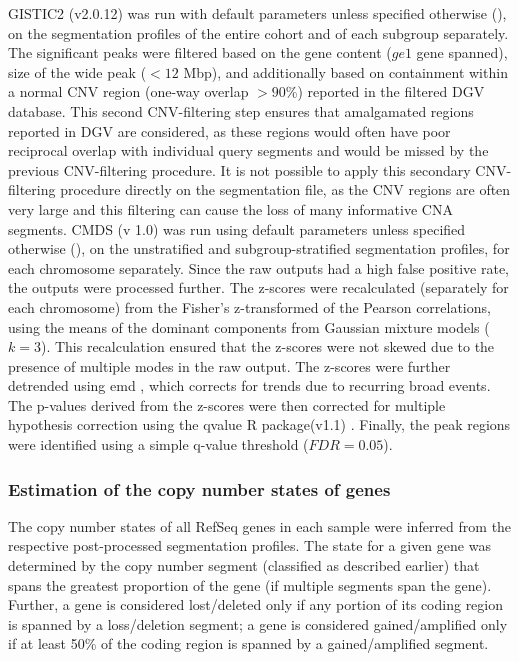 GISTIC2 (v2.0.12)  was run with default parameters unless specified otherwise (), on the segmentation profiles of the entire cohort and of each subgroup separately. The significant peaks were filtered based on the gene content ($ge 1$ gene spanned), size of the wide peak ($< 12$ Mbp), and additionally based on containment within a normal CNV region (one-way overlap $> 90$\%) reported in the filtered DGV database. This second CNV-filtering step ensures that amalgamated regions reported in DGV are considered, as these regions would often have poor reciprocal overlap with individual query segments and would be missed by the previous CNV-filtering procedure. It is not possible to apply this secondary CNV-filtering procedure directly on the segmentation file, as the CNV regions are often very large and this filtering can cause the loss of many informative CNA segments.
CMDS (v 1.0)  was run using default parameters unless specified otherwise (), on the unstratified and subgroup-stratified segmentation profiles, for each chromosome separately. Since the raw outputs had a high false positive rate, the outputs were processed further. The z-scores were recalculated (separately for each chromosome) from the Fisher’s z-transformed of the Pearson correlations, using the means of the dominant components from Gaussian mixture models ($k = 3$). This recalculation ensured that the z-scores were not skewed due to the presence of multiple modes in the raw output. The z-scores were further detrended using \gls{emd} , which corrects for trends due to recurring broad events. The p-values derived from the z-scores were then corrected for multiple hypothesis correction using the qvalue R package(v1.1) . Finally, the peak regions were identified using a simple q-value threshold ($FDR = 0.05$).

\subsubsection{Estimation of the copy number states of genes}

The copy number states of all RefSeq genes in each sample were inferred from the respective post-processed segmentation profiles. The state for a given gene was determined by the copy number segment (classified as described earlier) that spans the greatest proportion of the gene (if multiple segments span the gene). Further, a gene is considered lost/deleted only if any portion of its coding region is spanned by a loss/deletion segment; a gene is considered gained/amplified only if at least 50\% of the coding region is spanned by a gained/amplified segment.

